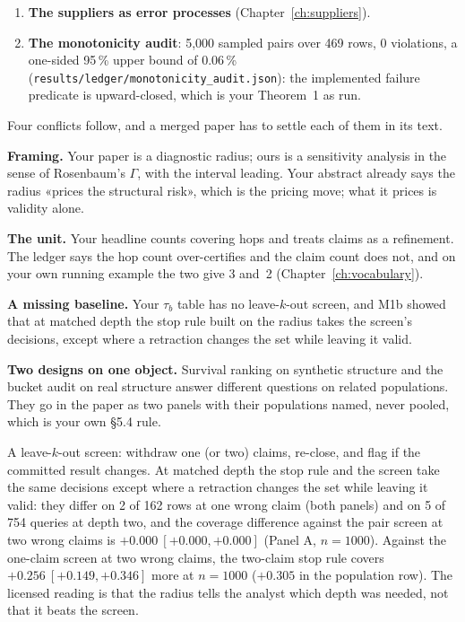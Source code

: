 \begin{enumerate}[nosep, leftmargin=*]
  \texttt{tests/\allowbreak benchmarks/\allowbreak test\_audit\_oracle.py} (\texttt{results/\allowbreak ledger/\allowbreak PREREGISTRATION.md}, A.0b).
\item \textbf{The suppliers as error processes} (Chapter~\ref{ch:suppliers}).
\item \textbf{The monotonicity audit}: 5,000 sampled pairs over 469 rows, 0 violations, a one-sided 95\,\%
  upper bound of 0.06\,\% (\texttt{results/\allowbreak ledger/\allowbreak monotonicity\_audit.json}): the implemented failure
  predicate is upward-closed, which is your Theorem~1 as run.
\end{enumerate}

Four conflicts follow, and a merged paper has to settle each of them in its text.

\textbf{Framing.} Your paper is a diagnostic radius; ours is a sensitivity analysis in the sense of
Rosenbaum's $\Gamma$, with the interval leading. Your abstract already says the radius «prices the
structural risk», which is the pricing move; what it prices is validity alone.

\textbf{The unit.} Your headline counts covering hops and treats claims as a refinement. The ledger says
the hop count over-certifies and the claim count does not, and on your own running example the two give
3 and~2 (Chapter~\ref{ch:vocabulary}).

\textbf{A missing baseline.} Your $\tau_b$ table has no leave-$k$-out screen, and M1b showed that at matched
depth the stop rule built on the radius takes the screen's decisions, except where a retraction changes
the set while leaving it valid.

\textbf{Two designs on one object.} Survival ranking on synthetic structure and the bucket audit on real
structure answer different questions on related populations. They go in the paper as two panels with
their populations named, never pooled, which is your own \S5.4 rule.

%
{A leave-$k$-out screen: withdraw one (or two) claims, re-close, and flag if the committed result changes.
At matched depth the stop rule and the screen take the same decisions except where a retraction changes
the set while leaving it valid: they differ on 2 of 162 rows at one wrong claim (both panels) and on 5 of
754 queries at depth two, and the coverage difference against the pair screen at two wrong claims is
$+0.000\ [+0.000, +0.000]$ (Panel A, $n = 1000$).
Against the one-claim screen at two wrong claims, the two-claim stop rule covers $+0.256\ [+0.149, +0.346]$
more at $n = 1000$ ($+0.305$ in the population row). The licensed reading is that the radius tells the
analyst which depth was needed, not that it beats the screen.}

